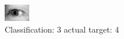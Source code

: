 \begin{figure}[h!]
\begin{center}
\includegraphics[width=0.60\columnwidth]{figures/ID3235_class_3_target_4.png}
\end{center}
\caption{ Classification: 3 actual target: 4}
\label{fig:ID3235_class_3_target_4}
\end{figure}
